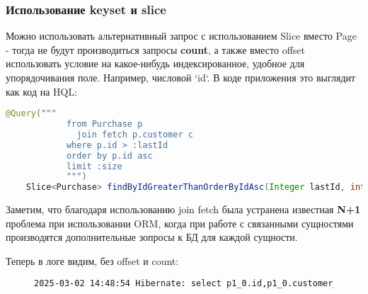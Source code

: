 \subsubsection{Использование keyset и slice}\label{subsubsec:slicekeysetpagination}
Можно использовать альтернативный запрос с использованием Slice вместо Page - тогда не будут производиться запросы
\textbf{count}, а также вместо offset использовать условие на какое-нибудь индексированное, удобное для упорядочивания
поле.
Например, числовой `id`.
В коде приложения это выглядит как код на HQL:
\begin{lstlisting}[language=java, frame=single, keepspaces=true, showstringspaces=false, basicstyle=\normalsize\ttfamily, breaklines=true,label={lst:hqlquery}]
    @Query("""
            from Purchase p
              join fetch p.customer c
            where p.id > :lastId
            order by p.id asc
            limit :size
            """)
    Slice<Purchase> findByIdGreaterThanOrderByIdAsc(Integer lastId, int size);
\end{lstlisting}
Заметим, что благодаря использованию join fetch была устранена известная \textbf{N+1} проблема при использовании ORM,
когда при работе с связанными сущностями производятся дополнительные зопросы к БД для каждой сущности.

Теперь в логе видим, без offset и count:
\begin{figure}[H]
\begin{lstlisting}[language=bash, frame=single, basicstyle=\normalsize\ttfamily, breaklines=true,label={lst:hiberpagelog}]
2025-03-02 14:48:54 Hibernate: select p1_0.id,p1_0.customer_id,c1_0.id,c1_0.bonus_points,c1_0.email,c1_0.loyalty_status,c1_0.name,c1_0.phone,p1_0.purchase_date,p1_0.shop_id,p1_0.total_amount from business.purchase p1_0 join business.customer c1_0 on c1_0.id=p1_0.customer_id where p1_0.id>? order by p1_0.id fetch first ? rows only
\end{lstlisting}\label{fig:hibernooffsetlisting}
\end{figure}

